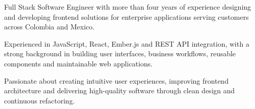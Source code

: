 
\begin{cvparagraph}
Full Stack Software Engineer with more than four years of experience designing and developing frontend solutions for enterprise applications serving customers across Colombia and Mexico.

Experienced in JavaScript, React, Ember.js and REST API integration, with a strong background in building user interfaces, business workflows, reusable components and maintainable web applications.

Passionate about creating intuitive user experiences, improving frontend architecture and delivering high-quality software through clean design and continuous refactoring.
\end{cvparagraph}
